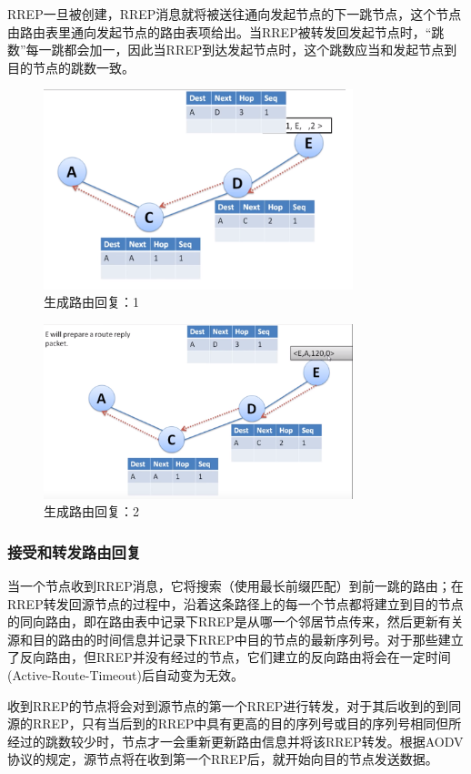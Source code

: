 \documentclass[12pt,a4paper]{article}
\begin{document}
RREP一旦被创建，RREP消息就将被送往通向发起节点的下一跳节点，这个节点由路由表里通向发起节点的路由表项给出。当RREP被转发回发起节点时，“跳数”每一跳都会加一，因此当RREP到达发起节点时，这个跳数应当和发起节点到目的节点的跳数一致。

\begin{figure}[htb]
\centering
\includegraphics[width=9cm]{gen_route_reply_1}
\caption{生成路由回复：1}
\end{figure}

\begin{figure}[htb]
\centering
\includegraphics[width=9cm]{gen_route_reply_2}
\caption{生成路由回复：2}
\end{figure}

\subsubsection{接受和转发路由回复}
当一个节点收到RREP消息，它将搜索（使用最长前缀匹配）到前一跳的路由；在RREP转发回源节点的过程中，沿着这条路径上的每一个节点都将建立到目的节点的同向路由，即在路由表中记录下RREP是从哪一个邻居节点传来，然后更新有关源和目的路由的时间信息并记录下RREP中目的节点的最新序列号。对于那些建立了反向路由，但RREP并没有经过的节点，它们建立的反向路由将会在一定时间(Active-Route-Timeout)后自动变为无效。

收到RREP的节点将会对到源节点的第一个RREP进行转发，对于其后收到的到同源的RREP，只有当后到的RREP中具有更高的目的序列号或目的序列号相同但所经过的跳数较少时，节点才一会重新更新路由信息并将该RREP转发。根据AODV协议的规定，源节点将在收到第一个RREP后，就开始向目的节点发送数据。
\end{document}
